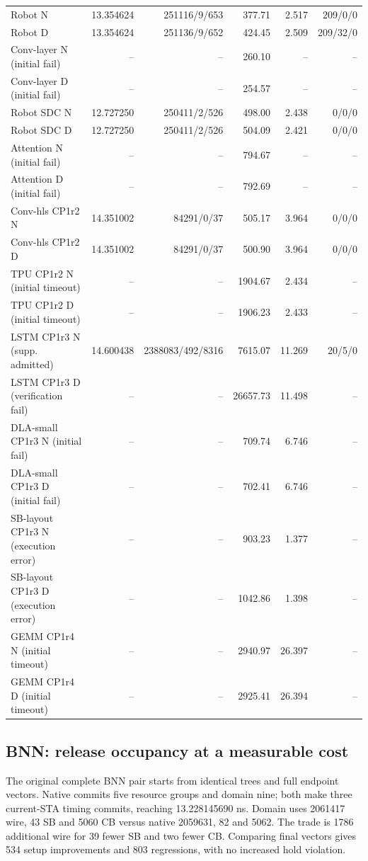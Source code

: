 \documentclass[conference,10pt]{IEEEtran}
\begin{document}
\begin{table}[t]
\begin{tabular}{lrrrrr}
Robot N&13.354624&251116/9/653&377.71&2.517&209/0/0\\
Robot D&13.354624&251136/9/652&424.45&2.509&209/32/0\\
Conv-layer N (initial fail)&--&--&260.10&--&--\\
Conv-layer D (initial fail)&--&--&254.57&--&--\\
Robot SDC N&12.727250&250411/2/526&498.00&2.438&0/0/0\\
Robot SDC D&12.727250&250411/2/526&504.09&2.421&0/0/0\\
Attention N (initial fail)&--&--&794.67&--&--\\
Attention D (initial fail)&--&--&792.69&--&--\\
Conv-hls CP1r2 N&14.351002&84291/0/37&505.17&3.964&0/0/0\\
Conv-hls CP1r2 D&14.351002&84291/0/37&500.90&3.964&0/0/0\\
TPU CP1r2 N (initial timeout)&--&--&1904.67&2.434&--\\
TPU CP1r2 D (initial timeout)&--&--&1906.23&2.433&--\\
LSTM CP1r3 N (supp. admitted)&14.600438&2388083/492/8316&7615.07&11.269&20/5/0\\
LSTM CP1r3 D (verification fail)&--&--&26657.73&11.498&--\\
DLA-small CP1r3 N (initial fail)&--&--&709.74&6.746&--\\
DLA-small CP1r3 D (initial fail)&--&--&702.41&6.746&--\\
SB-layout CP1r3 N (execution error)&--&--&903.23&1.377&--\\
SB-layout CP1r3 D (execution error)&--&--&1042.86&1.398&--\\
GEMM CP1r4 N (initial timeout)&--&--&2940.97&26.397&--\\
GEMM CP1r4 D (initial timeout)&--&--&2925.41&26.394&--\\
\hline\end{tabular}
\end{table}

\subsection{BNN: release occupancy at a measurable cost}
The original complete BNN pair starts from identical trees and full endpoint vectors. Native commits five resource groups and domain nine; both make three current-STA timing commits, reaching 13.228145690 ns. Domain uses 2061417 wire, 43 SB and 5060 CB versus native 2059631, 82 and 5062. The trade is 1786 additional wire for 39 fewer SB and two fewer CB. Comparing final vectors gives 534 setup improvements and 803 regressions, with no increased hold violation.
\end{document}
